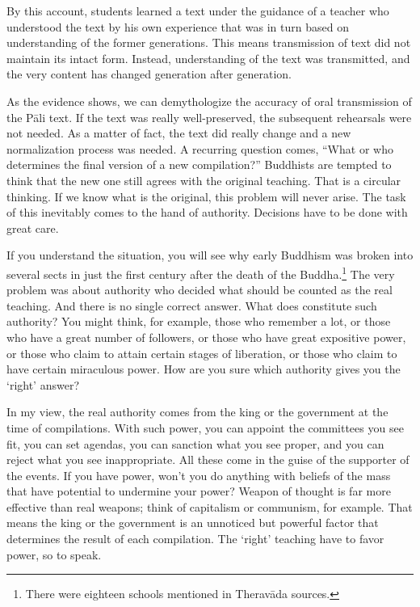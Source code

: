 By this account, students learned a text under the guidance of a teacher who understood the text by his own experience that was in turn based on understanding of the former generations. This means transmission of text did not maintain its intact form. Instead, understanding of the text was transmitted, and the very content has changed generation after generation.

As the evidence shows, we can demythologize the accuracy of oral transmission of the P\=ali text. If the text was really well-preserved, the subsequent rehearsals were not needed. As a matter of fact, the text did really change and a new normalization process was needed. A recurring question comes, ``What or who determines the final version of a new compilation?'' Buddhists are tempted to think that the new one still agrees with the original teaching. That is a circular thinking. If we know what is the original, this problem will never arise. The task of this inevitably comes to the hand of authority. Decisions have to be done with great care.

If you understand the situation, you will see why early Buddhism was broken into several sects in just the first century after the death of the Buddha.\footnote{There were eighteen schools mentioned in Therav\=ada sources.} The very problem was about authority who decided what should be counted as the real teaching. And there is no single correct answer. What does constitute such authority? You might think, for example, those who remember a lot, or those who have a great number of followers, or those who have great expositive power, or those who claim to attain certain stages of liberation, or those who claim to have certain miraculous power. How are you sure which authority gives you the `right' answer?

In my view, the real authority comes from the king or the government at the time of compilations. With such power, you can appoint the committees you see fit, you can set agendas, you can sanction what you see proper, and you can reject what you see inappropriate. All these come in the guise of the supporter of the events. If you have power, won't you do anything with beliefs of the mass that have potential to undermine your power? Weapon of thought is far more effective than real weapons; think of capitalism or communism, for example. That means the king or the government is an unnoticed but powerful factor that determines the result of each compilation. The `right' teaching have to favor power, so to speak.

